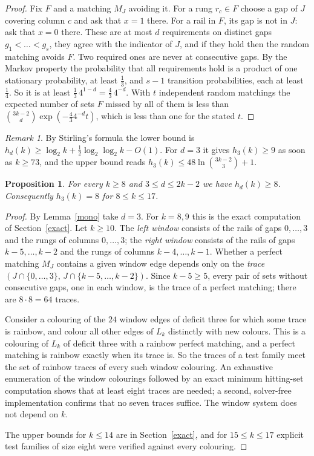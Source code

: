 \documentclass[11pt]{article}
\newtheorem{proposition}[theorem]{Proposition}
\theoremstyle{remark}
\newtheorem*{remark}{Remark}
\begin{document}
\begin{proof}
Fix \(F\) and a matching \(M_J\) avoiding it. For a rung \(r_c\in F\) choose
a gap of \(J\) covering column \(c\) and ask that \(x=1\) there. For a rail
in \(F\), its gap is not in \(J\): ask that \(x=0\) there. These are at most
\(d\) requirements on distinct gaps \(g_1<\dots<g_s\), they agree with the
indicator of \(J\), and if they hold then the random matching avoids \(F\).
Two required ones are never at consecutive gaps. By the Markov property the
probability that all requirements hold is a product of one stationary
probability, at least \(\tfrac13\), and \(s-1\) transition probabilities, each
at least \(\tfrac14\). So it is at least \(\tfrac13\,4^{1-d}=\tfrac43\,4^{-d}\).
With \(t\) independent random matchings the expected number of sets \(F\)
missed by all of them is less than
\(\binom{3k-2}{d}\exp(-\tfrac43 4^{-d}t)\), which is less than one for the
stated \(t\).
\end{proof}

\begin{remark}
By Stirling's formula the lower bound is
\(h_d(k)\ge\log_2 k+\tfrac12\log_2\log_2 k-O(1)\). For \(d=3\) it gives
\(h_3(k)\ge9\) as soon as \(k\ge73\), and the upper bound reads
\(h_3(k)\le 48\ln\binom{3k-2}{3}+1\).
\end{remark}

\begin{proposition}\label{windows}
For every \(k\ge8\) and \(3\le d\le2k-2\) we have \(h_d(k)\ge8\). Consequently
\(h_3(k)=8\) for \(8\le k\le17\).
\end{proposition}
\begin{proof}
By Lemma~\ref{mono} take \(d=3\). For \(k=8,9\) this is the exact computation
of Section~\ref{exact}. Let \(k\ge10\). The \emph{left window} consists of
the rails of gaps \(0,\dots,3\) and the rungs of columns \(0,\dots,3\); the
\emph{right window} consists of the rails of gaps \(k-5,\dots,k-2\) and the
rungs of columns \(k-4,\dots,k-1\). Whether a perfect matching \(M_J\)
contains a given window edge depends only on the \emph{trace}
\((J\cap\{0,\dots,3\},\,J\cap\{k-5,\dots,k-2\})\). Since \(k-5\ge5\), every
pair of sets without consecutive gaps, one in each window, is the trace of a
perfect matching; there are \(8\cdot8=64\) traces.

Consider a colouring of the \(24\) window edges of deficit three for which
some trace is rainbow, and colour all other edges of \(L_k\) distinctly with
new colours. This is a colouring of \(L_k\) of deficit three with a rainbow
perfect matching, and a perfect matching is rainbow exactly when its trace
is. So the traces of a test family meet the set of rainbow traces of every
such window colouring. An exhaustive enumeration of the window colourings
followed by an exact minimum hitting-set computation shows that at least
eight traces are needed; a second, solver-free implementation confirms
that no seven traces suffice. The window system does not depend on \(k\).

The upper bounds for \(k\le14\) are in Section~\ref{exact}, and for
\(15\le k\le17\) explicit test families of size eight were verified against
every colouring.
\end{proof}
\end{document}
